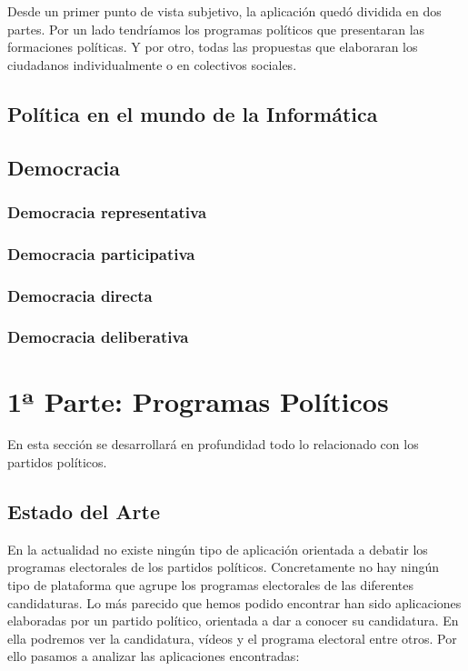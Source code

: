 Desde un primer punto de vista subjetivo, la aplicación quedó dividida en dos partes. Por un lado tendríamos los programas políticos que presentaran las formaciones políticas. Y por otro, todas las propuestas que elaboraran los ciudadanos individualmente o en colectivos sociales.

\subsection{Política en el mundo de la Informática}

\subsection{Democracia}

	\subsubsection{Democracia representativa}\label{sssec:Democracia_representativa}
	
	\subsubsection{Democracia participativa}\label{sssec:Democracia_participativa}
	
	\subsubsection{Democracia directa}\label{sssec:Democracia_directa}
	
	\subsubsection{Democracia deliberativa}\label{sssec:Democracia_deliberativa}
	

\section{1ª Parte: Programas Políticos}
En esta sección se desarrollará en profundidad todo lo relacionado con los partidos políticos.

  \subsection{Estado del Arte}
En la actualidad no existe ningún tipo de aplicación orientada a debatir los programas electorales de los partidos políticos. Concretamente no hay ningún tipo de plataforma que agrupe los programas electorales de las diferentes candidaturas.
Lo más parecido que hemos podido encontrar han sido aplicaciones elaboradas por un partido político, orientada a dar a conocer su candidatura. En ella podremos ver la candidatura, vídeos y el programa electoral entre otros. Por ello pasamos a analizar las aplicaciones encontradas:

